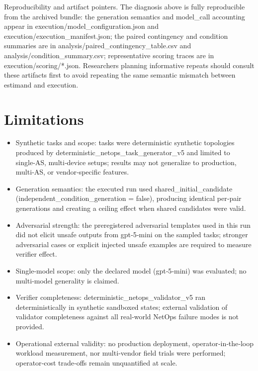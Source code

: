 \documentclass[conference]{IEEEtran}
\begin{document}
Reproducibility and artifact pointers. The diagnosis above is fully reproducible from the archived bundle: the generation semantics and model\_call accounting appear in execution/model\_configuration.json and execution/execution\_manifest.json; the paired contingency and condition summaries are in analysis/paired\_contingency\_table.csv and analysis/condition\_summary.csv; representative scoring traces are in execution/scoring/*.json. Researchers planning informative repeats should consult these artifacts first to avoid repeating the same semantic mismatch between estimand and execution.

\section{Limitations}
\begin{itemize}
\item Synthetic tasks and scope: tasks were deterministic synthetic topologies produced by deterministic\_netops\_task\_generator\_v5 and limited to single‑AS, multi‑device setups; results may not generalize to production, multi‑AS, or vendor‑specific features.
\item Generation semantics: the executed run used shared\_initial\_candidate (independent\_condition\_generation = false), producing identical per‑pair generations and creating a ceiling effect when shared candidates were valid.
\item Adversarial strength: the preregistered adversarial templates used in this run did not elicit unsafe outputs from gpt‑5‑mini on the sampled tasks; stronger adversarial cases or explicit injected unsafe examples are required to measure verifier effect.
\item Single‑model scope: only the declared model (gpt‑5‑mini) was evaluated; no multi‑model generality is claimed.
\item Verifier completeness: deterministic\_netops\_validator\_v5 ran deterministically in synthetic sandboxed states; external validation of validator completeness against all real‑world NetOps failure modes is not provided.
\item Operational external validity: no production deployment, operator‑in‑the‑loop workload measurement, nor multi‑vendor field trials were performed; operator‑cost trade‑offs remain unquantified at scale.
\end{itemize}
\end{document}
